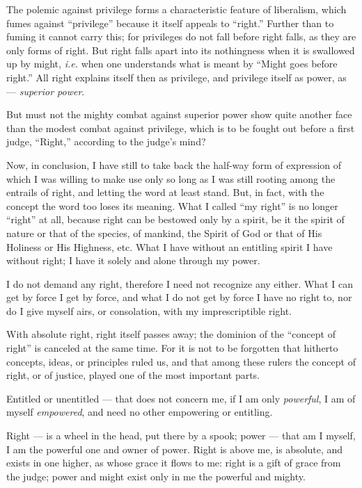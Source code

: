 The polemic against privilege forms a characteristic feature of liberalism, 
which fumes against ``privilege'' because it itself appeals to ``right.'' 
Further than to fuming it cannot carry this; for privileges do not fall before 
right falls, as they are only forms of right. But right falls apart into its 
nothingness when it is swallowed up by might, \textit{i.e.} when one 
understands what is meant by ``Might goes before right.'' All right explains 
itself then as privilege, and privilege itself as power, as --- \textit{superior power}.

But must not the mighty combat against superior power show quite another face 
than the modest combat against privilege, which is to be fought out before a 
first judge, ``Right,'' according to the judge's mind?

\myhrule


Now, in conclusion, I have still to take back the half-way form of expression 
of which I was willing to make use only so long as I was still rooting among 
the entrails of right, and letting the word at least stand. But, in fact, with 
the concept the word too loses its meaning. What I called ``my right'' is no 
longer ``right'' at all, because right can be bestowed only by a spirit, be 
it the spirit of nature or that of the species, of mankind, the Spirit of God 
or that of His Holiness or His Highness, etc. What I have without an entitling 
spirit I have without right; I have it solely and alone through my power.

I do not demand any right, therefore I need not recognize any either. What I 
can get by force I get by force, and what I do not get by force I have no 
right to, nor do I give myself airs, or consolation, with my imprescriptible 
right.

With absolute right, right itself passes away; the dominion of the ``concept 
of right'' is canceled at the same time. For it is not to be forgotten that 
hitherto concepts, ideas, or principles ruled us, and that among these rulers 
the concept of right, or of justice, played one of the most important parts.

Entitled or unentitled --- that does not concern me, if I am only 
\textit{powerful}, I am of myself \textit{empowered}, and need no other 
empowering or entitling.

Right --- is a wheel in the head, put there by a spook; power --- that am I 
myself, I am the powerful one and owner of power. Right is above me, is 
absolute, and exists in one higher, as whose grace it flows to me: right is a 
gift of grace from the judge; power and might exist only in me the powerful 
and mighty.

